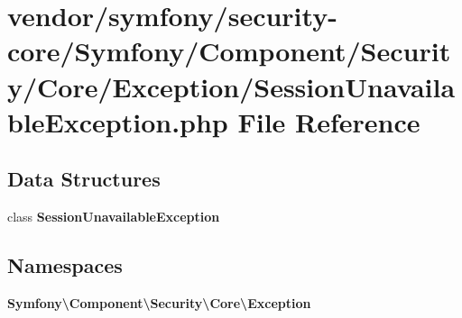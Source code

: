 \section{vendor/symfony/security-\/core/\+Symfony/\+Component/\+Security/\+Core/\+Exception/\+Session\+Unavailable\+Exception.php File Reference}
\label{_session_unavailable_exception_8php}
\subsection*{Data Structures}
\begin{DoxyCompactItemize}
\item 
class {\bf Session\+Unavailable\+Exception}
\end{DoxyCompactItemize}
\subsection*{Namespaces}
\begin{DoxyCompactItemize}
\item 
 {\bf Symfony\textbackslash{}\+Component\textbackslash{}\+Security\textbackslash{}\+Core\textbackslash{}\+Exception}
\end{DoxyCompactItemize}
